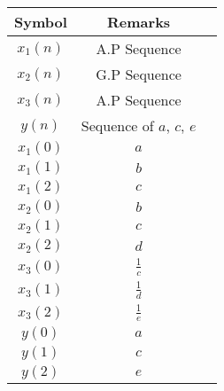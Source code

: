 \begin{tabular}{|c|c|c|}
    \hline
     \textbf{Symbol} & \textbf{Remarks} \\
    \hline
     $x_1(n)$ &  A.P Sequence\\[6pt]
    \hline
     $x_2(n)$ &  G.P Sequence\\[6pt]
    \hline
     $x_3(n)$ &  A.P Sequence\\[6pt]
    \hline
     $y(n)$   &  Sequence of $a$, $c$, $e$ \\[6pt]
    \hline
     $x_1(0)$ &  $a$\\[6pt]
    \hline
     $x_1(1)$ &  $b$\\[6pt]
    \hline
     $x_1(2)$ &  $c$\\[6pt]
    \hline
     $x_2(0)$ &  $b$\\[6pt]
    \hline
     $x_2(1)$ &  $c$\\[6pt]
    \hline
     $x_2(2)$ &  $d$\\[6pt]
    \hline
     $x_3(0)$ &  $\frac{1}{c}$\\[6pt]
    \hline
     $x_3(1)$ &  $\frac{1}{d}$\\[6pt]
    \hline
     $x_3(2)$ &  $\frac{1}{e}$\\[6pt]
    \hline
     $y(0)$   &  $a$\\[6pt]
    \hline
     $y(1)$   &  $c$\\[6pt]
    \hline
     $y(2)$   &  $e$\\[6pt]
    \hline
\end{tabular}

